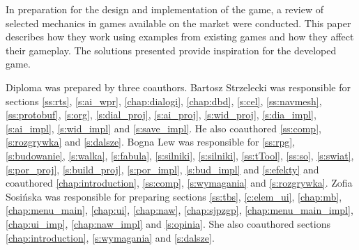 In preparation for the design and implementation of the game, a review of selected mechanics in games available
on the market were conducted. This paper describes how they work using examples from existing games and how
they affect their gameplay. The solutions presented provide inspiration for the developed game.

Diploma was prepared by three coauthors. Bartosz Strzelecki was responsible for sections \ref{ss:rts},
\ref{s:ai_wpr}, \ref{chap:dialogi}, \ref{chap:dbd}, \ref{s:cel}, \ref{ss:navmesh}, \ref{ss:protobuf}, \ref{s:org},
\ref{s:dial_proj}, \ref{s:ai_proj}, \ref{s:wid_proj}, \ref{s:dia_impl}, \ref{s:ai_impl}, \ref{s:wid_impl} and
\ref{s:save_impl}. He also coauthored \ref{ss:comp}, \ref{s:rozgrywka} and \ref{s:dalsze}. Bogna Lew
was responsible for \ref{ss:rpg}, \ref{s:budowanie}, \ref{s:walka}, \ref{s:fabula}, \ref{s:silniki}, \ref{s:silniki},
\ref{ss:tTool}, \ref{ss:so}, \ref{s:swiat}, \ref{s:por_proj}, \ref{s:build_proj}, \ref{s:por_impl}, \ref{s:bud_impl} and
\ref{s:efekty} and coauthored \ref{chap:introduction}, \ref{ss:comp}, \ref{s:wymagania} and \ref{s:rozgrywka}.
Zofia Sosińska was responsible for preparing sections \ref{ss:tbs}, \ref{c:elem_ui}, \ref{chap:mb},
\ref{chap:menu_main}, \ref{chap:ui}, \ref{chap:naw}, \ref{chap:sjpzgp}, \ref{chap:menu_main_impl}, \ref{chap:ui_imp},
\ref{chap:naw_impl} and  \ref{s:opinia}. She also coauthored sections \ref{chap:introduction}, \ref{s:wymagania} and \ref{s:dalsze}.
